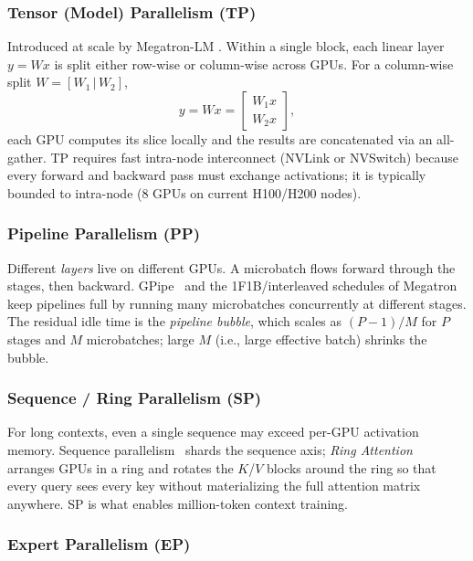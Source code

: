 \subsubsection{Tensor (Model) Parallelism (TP)}

Introduced at scale by Megatron-LM
\citep{shoeybi2019megatron,narayanan2021efficient}. Within a single
block, each linear layer $y = W x$ is split either row-wise or
column-wise across GPUs. For a column-wise split
$W = [W_1 \,|\, W_2]$,
\begin{equation}
y = W x = \begin{bmatrix} W_1 x \\ W_2 x \end{bmatrix},
\end{equation}
each GPU computes its slice locally and the results are concatenated
via an all-gather. TP requires fast intra-node interconnect (NVLink
or NVSwitch) because every forward and backward pass must exchange
activations; it is typically bounded to intra-node (8 GPUs on
current H100/H200 nodes).

\subsubsection{Pipeline Parallelism (PP)}

Different \emph{layers} live on different GPUs. A microbatch flows
forward through the stages, then backward.
GPipe~\citep{huang2019gpipe} and the 1F1B/interleaved schedules of
Megatron keep pipelines full by running many microbatches
concurrently at different stages. The residual idle time is the
\emph{pipeline bubble}, which scales as $(P - 1) / M$ for $P$ stages
and $M$ microbatches; large $M$ (i.e., large effective batch) shrinks
the bubble.

\subsubsection{Sequence / Ring Parallelism (SP)}

For long contexts, even a single sequence may exceed per-GPU
activation memory. Sequence
parallelism~\citep{li2023sequence,korthikanti2023reducing} shards
the sequence axis; \emph{Ring Attention}~\citep{liu2023ringattention}
arranges GPUs in a ring and rotates the $K$/$V$ blocks around the
ring so that every query sees every key without materializing the
full attention matrix anywhere. SP is what enables million-token
context training.

\subsubsection{Expert Parallelism (EP)}


